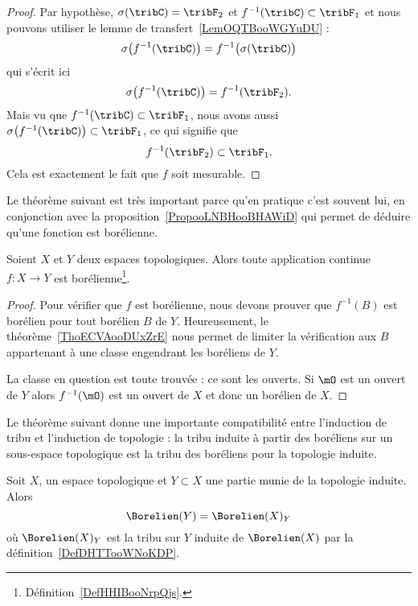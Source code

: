 \begin{proof}
    Par hypothèse, \( \sigma(\tribC)=\tribF_2\) et \( f^{-1}(\tribC)\subset \tribF_1\) et nous pouvons utiliser le lemme de transfert~\ref{LemOQTBooWGYuDU} :
    \begin{equation}
        \sigma\big( f^{-1}(\tribC) \big)=f^{-1}\big( \sigma(\tribC) \big)
    \end{equation}
    qui s'écrit ici
    \begin{equation}
        \sigma\big( f^{-1}(\tribC) \big)=f^{-1}(\tribF_2).
    \end{equation}
    Mais vu que \( f^{-1}(\tribC)\subset \tribF_1\), nous avons aussi \( \sigma\big( f^{-1}(\tribC) \big)\subset \tribF_1\), ce qui signifie que
    \begin{equation}
        f^{-1}(\tribF_2)\subset \tribF_1.
    \end{equation}
    Cela est exactement le fait que \( f\) soit mesurable.
\end{proof}

Le théorème suivant est très important parce qu'en pratique c'est souvent lui, en conjonction avec la proposition~\ref{PropooLNBHooBHAWiD} qui permet de déduire qu'une fonction est borélienne.
\begin{theorem}     \label{ThoJDOKooKaaiJh}
    Soient \( X\) et \( Y\) deux espaces topologiques. Alors toute application continue \( f\colon X\to Y\) est borélienne\footnote{Définition~\ref{DefHHIBooNrpQjs}.}.
\end{theorem}

\begin{proof}
    Pour vérifier que \( f\) est borélienne, nous devons prouver que \( f^{-1}(B)\) est borélien pour tout borélien \( B\) de \( Y\). Heureusement, le théorème~\ref{ThoECVAooDUxZrE} nous permet de limiter la vérification aux \( B\) appartenant à une classe engendrant les boréliens de \( Y\).

    La classe en question est toute trouvée : ce sont les ouverts. Si \( \mO\) est un ouvert de \( Y\) alors \( f^{-1}(\mO)\) est un ouvert de \( X\) et donc un borélien de \( X\).
\end{proof}

Le théorème suivant donne une importante compatibilité entre l'induction de tribu et l'induction de topologie : la tribu induite à partir des boréliens sur un sous-espace topologique est la tribu des boréliens pour la topologie induite.
\begin{theorem}     \label{ThoSVTHooChgvYa}
    Soit \( X\), un espace topologique et \( Y\subset X\) une partie munie de la topologie induite. Alors
    \begin{equation}
        \Borelien(Y)=\Borelien(X)_Y
    \end{equation}
    où \( \Borelien(X)_Y\) est la tribu sur \( Y\) induite de \( \Borelien(X)\) par la définition~\ref{DefDHTTooWNoKDP}.
\end{theorem}

